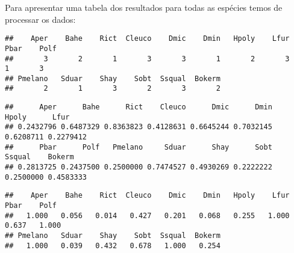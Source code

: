 \documentclass[
]{book}
\newenvironment{Shaded}{\begin{snugshade}}{\end{snugshade}}
\newcommand{\KeywordTok}[1]{\textcolor[rgb]{0.13,0.29,0.53}{\textbf{#1}}}
\newcommand{\NormalTok}[1]{#1}
\newcommand{\OperatorTok}[1]{\textcolor[rgb]{0.81,0.36,0.00}{\textbf{#1}}}
\newcommand{\StringTok}[1]{\textcolor[rgb]{0.31,0.60,0.02}{#1}}
\begin{document}
Para apresentar uma tabela dos resultados para todas as espécies temos de processar os dados:

\begin{Shaded}
\end{Shaded}

\begin{verbatim}
##    Aper    Bahe    Rict  Cleuco    Dmic    Dmin   Hpoly    Lfur    Pbar    Polf 
##       3       2       1       3       3       1       2       3       1       3 
## Pmelano   Sduar    Shay    Sobt  Ssqual  Bokerm 
##       2       1       3       2       3       2
\end{verbatim}

\begin{Shaded}
\end{Shaded}

\begin{verbatim}
##      Aper      Bahe      Rict    Cleuco      Dmic      Dmin     Hpoly      Lfur 
## 0.2432796 0.6487329 0.8363823 0.4128631 0.6645244 0.7032145 0.6208711 0.2279412 
##      Pbar      Polf   Pmelano     Sduar      Shay      Sobt    Ssqual    Bokerm 
## 0.2813725 0.2437500 0.2500000 0.7474527 0.4930269 0.2222222 0.2500000 0.4583333
\end{verbatim}

\begin{Shaded}
\end{Shaded}

\begin{verbatim}
##    Aper    Bahe    Rict  Cleuco    Dmic    Dmin   Hpoly    Lfur    Pbar    Polf 
##   1.000   0.056   0.014   0.427   0.201   0.068   0.255   1.000   0.637   1.000 
## Pmelano   Sduar    Shay    Sobt  Ssqual  Bokerm 
##   1.000   0.039   0.432   0.678   1.000   0.254
\end{verbatim}

\begin{Shaded}
\end{Shaded}
\end{document}
